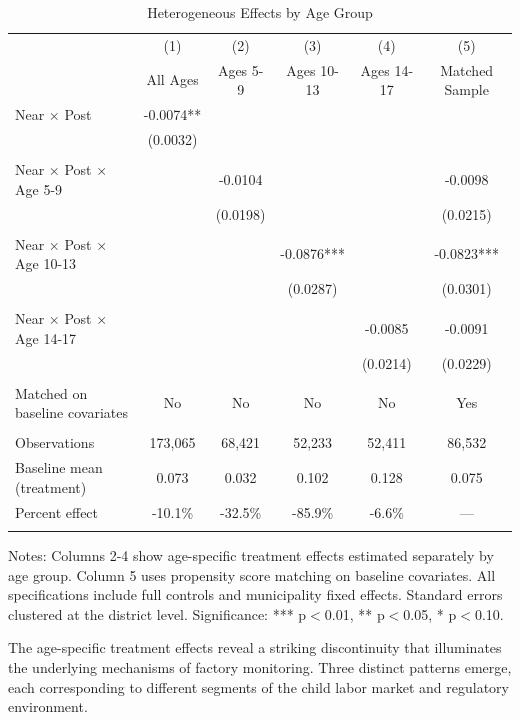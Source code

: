 \documentclass[12pt]{article}
\begin{document}
\begin{table}[H]
\centering
\caption{Heterogeneous Effects by Age Group}
\label{tab:age_hetero}
\begin{threeparttable}
\begin{tabular}{lccccc}
\toprule
& (1) & (2) & (3) & (4) & (5) \\
& All Ages & Ages 5-9 & Ages 10-13 & Ages 14-17 & Matched Sample \\
\midrule
Near × Post & -0.0074** & & & & \\
& (0.0032) & & & & \\
& & & & & \\
Near × Post × Age 5-9 & & -0.0104 & & & -0.0098 \\
& & (0.0198) & & & (0.0215) \\
& & & & & \\
Near × Post × Age 10-13 & & & -0.0876*** & & -0.0823*** \\
& & & (0.0287) & & (0.0301) \\
& & & & & \\
Near × Post × Age 14-17 & & & & -0.0085 & -0.0091 \\
& & & & (0.0214) & (0.0229) \\
\\
\midrule
Matched on baseline covariates & No & No & No & No & Yes \\
\\
\midrule
Observations & 173,065 & 68,421 & 52,233 & 52,411 & 86,532 \\
Baseline mean (treatment) & 0.073 & 0.032 & 0.102 & 0.128 & 0.075 \\
Percent effect & -10.1\% & -32.5\% & -85.9\% & -6.6\% & --- \\
\\
\bottomrule
\end{tabular}
\begin{tablenotes}
\footnotesize
\item Notes: Columns 2-4 show age-specific treatment effects estimated separately by age group. Column 5 uses propensity score matching on baseline covariates. All specifications include full controls and municipality fixed effects. Standard errors clustered at the district level. Significance: *** p$<$0.01, ** p$<$0.05, * p$<$0.10.
\end{tablenotes}
\end{threeparttable}
\end{table}

The age-specific treatment effects reveal a striking discontinuity that illuminates the underlying mechanisms of factory monitoring. Three distinct patterns emerge, each corresponding to different segments of the child labor market and regulatory environment.
\end{document}
